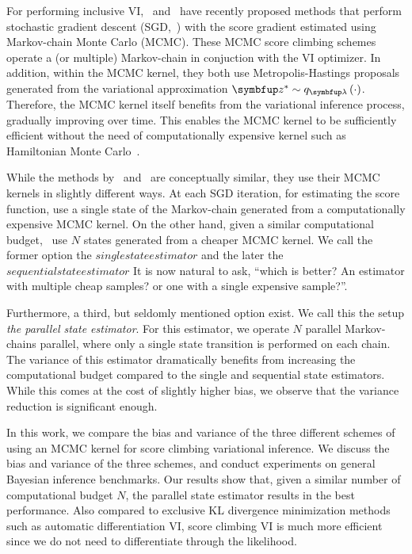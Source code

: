 For performing inclusive VI,~\citet{NEURIPS2020_b2070693} and~\citet{pmlr-v124-ou20a} have recently proposed  methods that perform stochastic gradient descent (SGD,~\citealt{robbins_stochastic_1951}) with the score gradient estimated using Markov-chain Monte Carlo (MCMC).
These MCMC score climbing schemes operate a (or multiple) Markov-chain in conjuction with the VI optimizer.
In addition, within the MCMC kernel, they both use Metropolis-Hastings proposals generated from the variational approximation \(\vz^* \sim q_{\vlambda}\left(\cdot\right)\).
Therefore, the MCMC kernel itself benefits from the variational inference process, gradually improving over time.
This enables the MCMC kernel to be sufficiently efficient without the need of computationally expensive kernel such as Hamiltonian Monte Carlo~\citep{duane_hybrid_1987, neal_mcmc_2011, betancourt_conceptual_2017}.

While the methods by~\citeauthor{NEURIPS2020_b2070693} and~\citeauthor{pmlr-v124-ou20a} are conceptually similar, they use their MCMC kernels in slightly different ways.
At each SGD iteration, for estimating the score function, \citeauthor{NEURIPS2020_b2070693} use a single state of the Markov-chain generated from a computationally expensive MCMC kernel.
On the other hand, given a similar computational budget,~\citeauthor{pmlr-v124-ou20a} use \(N\) states generated from a cheaper MCMC kernel.
We call the former option the \(single state estimator\) and the later the \(sequential state estimator\)
It is now natural to ask, ``which is better? An estimator with multiple cheap samples? or one with a single expensive sample?''.

Furthermore, a third, but seldomly mentioned option exist.
We call this the setup \textit{the parallel state estimator}.
For this estimator, we operate \(N\) parallel Markov-chains parallel, where only a single state transition is performed on each chain.
The variance of this estimator dramatically benefits from increasing the computational budget compared to the single and sequential state estimators.
While this comes at the cost of slightly higher bias, we observe that the variance reduction is significant enough.

In this work, we compare the bias and variance of the three different schemes of using an MCMC kernel for score climbing variational inference.
We discuss the bias and variance of the three schemes, and conduct experiments on general Bayesian inference benchmarks.
Our results show that, given a similar number of computational budget \(N\), the parallel state estimator results in the best performance.
Also compared to exclusive KL divergence minimization methods such as automatic differentiation VI, score climbing VI is much more efficient since we do not need to differentiate through the likelihood.

